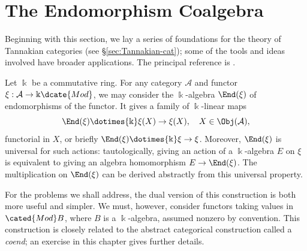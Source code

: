 
\section{The Endomorphism Coalgebra}\label{sec:coend}
\hypertarget{o014.aljabr2.chapter9.coendomorphism-coalgebra-a}{ }
Beginning with this section, we lay a series of foundations for the theory of
Tannakian categories (see \S\ref{sec:Tannakian-cat}); some of the tools and
ideas involved have broader applications. The principal reference is
\cite{Del90}.

Let $\Bbbk$ be a commutative ring. For any category $\mathcal{A}$ and functor
$\xi:\mathcal{A}\to\Bbbk\dcate{Mod}$, we may consider the $\Bbbk$-algebra
$\End(\xi)$ of endomorphisms of the functor. It gives a family of
$\Bbbk$-linear maps
\[ \End(\xi) \dotimes{\Bbbk} \xi(X) \to \xi(X), \quad X \in \Obj(\mathcal{A}), \]
functorial in $X$, or briefly $\End(\xi)\dotimes{\Bbbk}\xi\to\xi$.
Moreover, $\End(\xi)$ is universal for such actions: tautologically, giving
an action of a $\Bbbk$-algebra $E$ on $\xi$ is equivalent to giving an
algebra homomorphism $E\to\End(\xi)$. The multiplication on $\End(\xi)$ can
be derived abstractly from this universal property.

For the problems we shall address, the dual version of this construction is
both more useful and simpler. We must, however, consider functors taking
values in $\cated{Mod}B$, where $B$ is a $\Bbbk$-algebra, assumed nonzero by
convention. This construction is closely related to the abstract categorical
construction called a \emph{coend}; an exercise in this chapter gives further
details.


